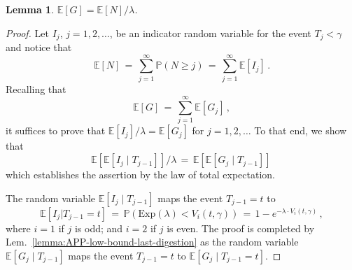 \documentclass[11pt]{article}
\def\LongVersion{}
\def\LongVersionEnd{}
\newtheorem{lemma}[theorem]{Lemma}
\theoremstyle{definition}
\theoremstyle{plain}
\newtheorem{lemma}[theorem]{Lemma}
\theoremstyle{definition}
\theoremstyle{plain}
\newtheorem{lemma}{Lemma}[section]
\theoremstyle{definition}
\theoremstyle{plain}
\newcommand{\Lem}{Lem.}
\newcommand{\Expect}{\mathbb{E}}
\newcommand{\Prob}{\mathbb{P}}
\newcommand{\ExpDist}{\mathrm{Exp}}
\begin{document}
\begin{lemma} \label{lemma:APP-digestion-equals-number-meaningful}
$\Expect[G]
=
\Expect[N] / \lambda$.
\end{lemma}
%
\LongVersion %
\begin{proof}
Let $I_{j}$, $j = 1, 2, \dots$, be an indicator random variable for the event
$T_{j} < \gamma$
and notice that
\[
\Expect[N]
\, = \,
\sum_{j = 1}^{\infty} \Prob \left( N \geq j \right)
\, = \,
\sum_{j = 1}^{\infty} \Expect \left[ I_{j} \right] \, .
\]
Recalling that
\[
\Expect[G]
\, = \,
\sum_{j = 1}^{\infty} \Expect \left[ G_{j} \right] \, ,
\]
it suffices to prove that
$\Expect[I_{j}] / \lambda = \Expect[G_{j}]$
for $j = 1, 2, \dots$
To that end, we show that
\[
\Expect \left[ \Expect \left[ I_{j} \mid T_{j - 1} \right] \right] / \lambda
\, = \,
\Expect \left[ \Expect \left[ G_{j} \mid T_{j - 1} \right] \right] \,
\]
which establishes the assertion by the law of total expectation.

The random variable
$\Expect[I_{j} \mid T_{j - 1}]$
maps the event
$T_{j - 1} = t$
to
\[
\Expect[I_{j} | T_{j - 1} = t]
\, = \,
\Prob(\ExpDist(\lambda) < V_{i}(t, \gamma))
\, = \,
1 - e^{-\lambda \cdot V_{i}(t, \gamma)} \, ,
\]
where
$i = 1$
if $j$ is odd; and
$i = 2$
if $j$ is even.
The proof is completed by \Lem{}~\ref{lemma:APP-low-bound-last-digestion} as
the random variable
$\Expect[G_{j} \mid T_{j - 1}]$
maps the event
$T_{j - 1} = t$
to
$\Expect[G_{j} \mid T_{j - 1} = t]$.
\end{proof}
\LongVersionEnd %
\end{document}
